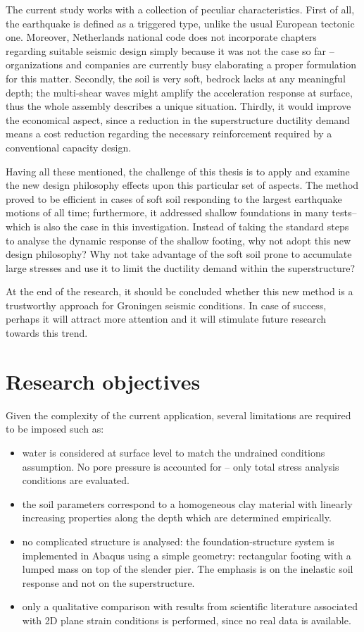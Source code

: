 \documentclass[12pt,a4paper]{report}
\begin{document}
The current study works with a collection of peculiar characteristics. First of all, the earthquake is defined as a triggered type, unlike the usual European tectonic one. Moreover, Netherlands national code does not incorporate chapters regarding suitable seismic design simply because it was not the case so far – organizations and companies are currently busy elaborating a proper formulation for this matter. Secondly, the soil is very soft, bedrock lacks at any meaningful depth; the multi-shear waves might amplify the acceleration response at surface, thus the whole assembly describes a unique situation. Thirdly, it would improve the economical aspect, since a reduction in the superstructure ductility demand means a cost reduction regarding the necessary reinforcement required by a conventional capacity design.

Having all these mentioned, the challenge of this thesis is to apply and examine the new design philosophy effects upon this particular set of aspects. The method proved to be efficient in cases of soft soil responding to the largest earthquake motions of all time; furthermore, it addressed shallow foundations in many tests– which is also the case in this investigation. Instead of taking the standard steps to analyse the dynamic response of the shallow footing, why not adopt this new design philosophy? Why not take advantage of the soft soil prone to accumulate large stresses and use it to limit the ductility demand within the superstructure? 

At the end of the research, it should be concluded whether this new method is a trustworthy approach for Groningen seismic conditions. In case of success, perhaps it will attract more attention and it will stimulate future research towards this trend.



\section{Research objectives}
Given the complexity of the current application, several limitations are required to be imposed such as:
\begin{itemize}
	\item water is considered at surface level to match the undrained conditions assumption. No pore pressure is accounted for – only total stress analysis conditions are evaluated.
	\item the soil parameters correspond to a homogeneous clay material with linearly increasing properties along the depth which are determined empirically.
	\item no complicated structure is analysed: the foundation-structure system is implemented in Abaqus using a simple geometry: rectangular footing with a lumped mass on top of the slender pier. The emphasis is on the inelastic soil response and not on the superstructure.
	\item only a qualitative comparison with results from scientific literature associated with 2D plane strain conditions is performed, since no real data is available.
\end{itemize}
\end{document}

